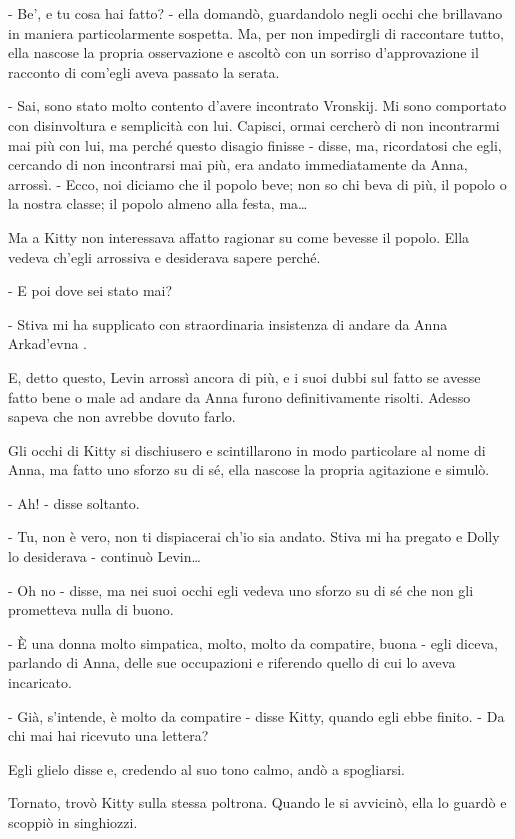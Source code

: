 - Be', e tu cosa hai fatto? - ella domandò, guardandolo negli occhi che brillavano in maniera particolarmente sospetta. Ma, per non impedirgli di raccontare tutto, ella nascose la propria osservazione e ascoltò con un sorriso d'approvazione il racconto di com'egli aveva passato la serata. 

- Sai, sono stato molto contento d'avere incontrato Vronskij. Mi sono comportato con disinvoltura e semplicità con lui. Capisci, ormai cercherò di non incontrarmi mai più con lui, ma perché questo disagio finisse - disse, ma, ricordatosi che egli, cercando di non incontrarsi mai più, era andato immediatamente da Anna, arrossì. - Ecco, noi diciamo che il popolo beve; non so chi beva di più, il popolo o la nostra classe; il popolo almeno alla festa, ma\ldots{} 

Ma a Kitty non interessava affatto ragionar su come bevesse il popolo. Ella vedeva ch'egli arrossiva e desiderava sapere perché. 

- E poi dove sei stato mai? 

- Stiva mi ha supplicato con straordinaria insistenza di andare da Anna Arkad'evna . 

E, detto questo, Levin arrossì ancora di più, e i suoi dubbi sul fatto se avesse fatto bene o male ad andare da Anna furono definitivamente risolti. Adesso sapeva che non avrebbe dovuto farlo. 

Gli occhi di Kitty si dischiusero e scintillarono in modo particolare al nome di Anna, ma fatto uno sforzo su di sé, ella nascose la propria agitazione e simulò. 

- Ah! - disse soltanto. 

- Tu, non è vero, non ti dispiacerai ch'io sia andato. Stiva mi ha pregato e Dolly lo desiderava - continuò Levin\ldots{} 

- Oh no - disse, ma nei suoi occhi egli vedeva uno sforzo su di sé che non gli prometteva nulla di buono. 

- È una donna molto simpatica, molto, molto da compatire, buona - egli diceva, parlando di Anna, delle sue occupazioni e riferendo quello di cui lo aveva incaricato. 

- Già, s'intende, è molto da compatire - disse Kitty, quando egli ebbe finito. - Da chi mai hai ricevuto una lettera? 

Egli glielo disse e, credendo al suo tono calmo, andò a spogliarsi. 

Tornato, trovò Kitty sulla stessa poltrona. Quando le si avvicinò, ella lo guardò e scoppiò in singhiozzi. 

